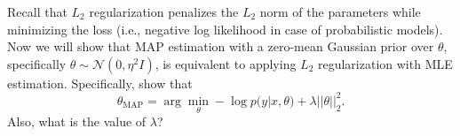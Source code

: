 \item  {} Recall that $L_2$ regularization penalizes the $L_2$ norm
of the parameters while minimizing the loss (i.e., negative log likelihood in case of
probabilistic models).
Now we will show that MAP estimation with a zero-mean
Gaussian prior over $\theta$, specifically $\theta \sim \mathcal{N}(0, \eta^2I)$,
is equivalent to applying $L_2$ regularization with MLE estimation. Specifically,
show that $$\theta_{\text{MAP}} = \arg\min_\theta - \log p(y|x,\theta) + \lambda||\theta||^2_2.$$
Also, what is the value of $\lambda$?


\ifnum{} {
  
} \fi

